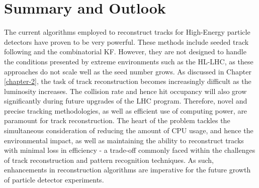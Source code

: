 

\chapter{Summary and Outlook}
\label{chapter-8}









The current algorithms employed to reconstruct tracks for High-Energy particle detectors have proven to be very powerful. These methods include seeded track following and the combinatorial KF. However, they are not designed to handle the conditions presented by extreme environments such as the HL-LHC, as these approaches do not scale well as the seed number grows. As discussed in Chapter \ref{chapter-2}, the task of track reconstruction becomes increasingly difficult as the luminosity increases. The collision rate and hence hit occupancy will also grow significantly during future upgrades of the LHC program. Therefore, novel and precise tracking methodologies, as well as efficient use of computing power, are paramount for track reconstruction. The heart of the problem tackles the simultaneous consideration of reducing the amount of CPU usage, and hence the environmental impact, as well as maintaining the ability to reconstruct tracks with minimal loss in efficiency - a trade-off commonly faced within the challenges of track reconstruction and pattern recognition techniques. As such, enhancements in reconstruction algorithms are imperative for the future growth of particle detector experiments. 

